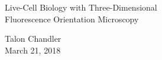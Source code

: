 \documentclass[presentation]{beamer}
\begin{document}
\begin{frame}{
    \vspace{0em}
    \begin{center}
      Live-Cell Biology with Three-Dimensional\\
      Fluorescence Orientation Microscopy
    \end{center}}
  \vspace{-2em}
  \centering
  \begin{center}
    \vspace{0em}
    Talon Chandler\\ \vspace{0.5em}
  March 21, 2018
  \end{center}
\end{frame}
\end{document}
